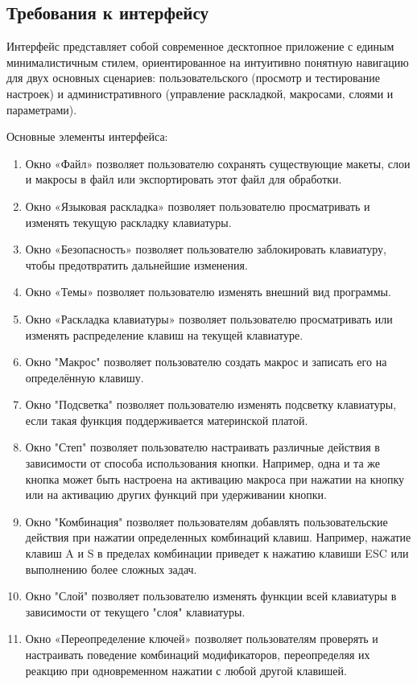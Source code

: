 \subsection{Требования к интерфейсу}

Интерфейс представляет собой современное десктопное приложение с единым минималистичным стилем, ориентированное на интуитивно понятную навигацию для двух основных сценариев: пользовательского (просмотр и тестирование настроек) и административного (управление раскладкой, макросами, слоями и параметрами).

Основные элементы интерфейса:

\begin{enumerate}
\item Окно «Файл» позволяет пользователю сохранять существующие макеты, слои и макросы в файл или экспортировать этот файл для обработки.
\item Окно «Языковая раскладка» позволяет пользователю просматривать и изменять текущую раскладку клавиатуры.
\item Окно «Безопасность» позволяет пользователю заблокировать клавиатуру, чтобы предотвратить дальнейшие изменения.
\item Окно «Темы» позволяет пользователю изменять внешний вид программы.
\item Окно «Раскладка клавиатуры» позволяет пользователю просматривать или изменять распределение клавиш на текущей клавиатуре.
\item Окно "Макрос" позволяет пользователю создать макрос и записать его на определённую клавишу.
\item Окно "Подсветка" позволяет пользователю изменять подсветку клавиатуры, если такая функция поддерживается материнской платой.
\item Окно "Степ" позволяет пользователю настраивать различные действия в зависимости от способа использования кнопки. Например, одна и та же кнопка может быть настроена на активацию макроса при нажатии на кнопку или на активацию других функций при удерживании кнопки.
\item Окно "Комбинация" позволяет пользователям добавлять пользовательские действия при нажатии определенных комбинаций клавиш. Например, нажатие клавиш A и S в пределах комбинации приведет к нажатию клавиши ESC или выполнению более сложных задач.
\item Окно "Слой" позволяет пользователю изменять функции всей клавиатуры в зависимости от текущего "слоя" клавиатуры.
\item Окно «Переопределение ключей» позволяет пользователям проверять и настраивать поведение комбинаций модификаторов, переопределяя их реакцию при одновременном нажатии с любой другой клавишей.

\end{enumerate}
